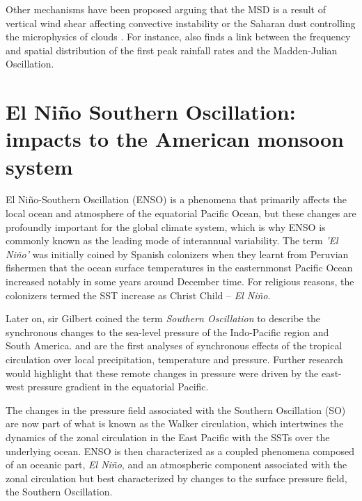 Other mechanisms have been proposed arguing that the MSD is a result of vertical wind shear affecting convective instability or the Saharan dust controlling  the microphysics of clouds \citep{angeles2010origins}.
For instance, \cite{perdigon2019} also finds a link between the frequency and spatial distribution of the first peak rainfall rates and the Madden-Julian Oscillation. 

\section{El Niño Southern Oscillation: impacts to the American monsoon system}
\label{sub:lit_enso}



 El Niño-Southern Oscillation (ENSO) is a phenomena that primarily affects the local ocean and atmosphere of the equatorial Pacific Ocean, but these changes are profoundly important for the global climate system, which is why ENSO is commonly known as the leading mode of interannual variability. 
 The term \textit{'El Niño'} was initially coined by Spanish colonizers when they learnt from Peruvian fishermen that the ocean surface temperatures in the easternmonst Pacific Ocean increased notably in some years around December time. 
 For religious reasons, the colonizers termed the SST increase as Christ Child -- \textit{El Niño}. 
 
 
 
  Later on, sir Gilbert \cite{walker1924} coined the term \textit{Southern Oscillation} to describe the synchronous changes to the sea-level pressure of the Indo-Pacific region and South America. 
  \cite{walker1924} and \cite{walker1932} are the first analyses of synchronous effects of the tropical circulation over local precipitation, temperature and pressure. Further research \citep[e.g.][]{troup1965} would highlight that these remote changes in pressure were driven by the east-west pressure gradient in the equatorial Pacific. 
  
  The changes in the pressure field associated with the Southern Oscillation (SO) are now part of what is known as the Walker circulation, which intertwines the dynamics of the zonal circulation in the East Pacific with the SSTs over the underlying ocean. ENSO is then characterized as a coupled phenomena composed of an oceanic part, \textit{El Niño}, and an atmospheric component associated with the zonal circulation but best characterized by changes to the surface pressure field, the Southern Oscillation. 
  
